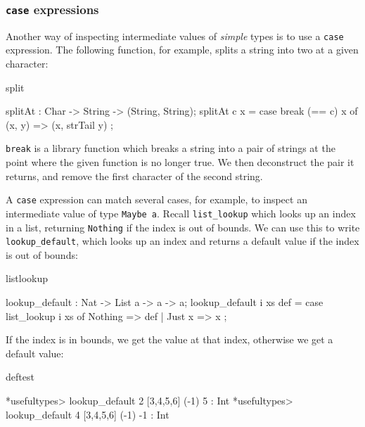 \subsubsection*{\texttt{case} expressions}

Another way of inspecting intermediate values of \emph{simple} types
is to use a \texttt{case} expression.
The following function, for example, splits a string into two at a given character:

\begin{SaveVerbatim}{split}

splitAt : Char -> String -> (String, String);
splitAt c x = case break (== c) x of {
                  (x, y) => (x, strTail y)
              };

\end{SaveVerbatim}

\noindent
\texttt{break} is a library function which breaks a string into a pair of strings
at the point where the given function is no longer true. We then deconstruct the
pair it returns, and remove the first character of the second string.

A \texttt{case} expression can match several cases, for example, to inspect an
intermediate value of type \texttt{Maybe a}. Recall \texttt{list\_lookup} which
looks up an index in a list, returning \texttt{Nothing} if the index is out
of bounds. We can use this to write \texttt{lookup\_default}, which
looks up an index and returns a default value if the index is out of bounds:

\begin{SaveVerbatim}{listlookup}

lookup_default : Nat -> List a -> a -> a;
lookup_default i xs def = case list_lookup i xs of {
                              Nothing => def
                            | Just x => x
                          };

\end{SaveVerbatim}

\noindent
If the index is in bounds, we get the value at that index, otherwise we get
a default value:

\begin{SaveVerbatim}{deftest}

*usefultypes> lookup_default 2 [3,4,5,6] (-1)
5 : Int
*usefultypes> lookup_default 4 [3,4,5,6] (-1)
-1 : Int

\end{SaveVerbatim}


